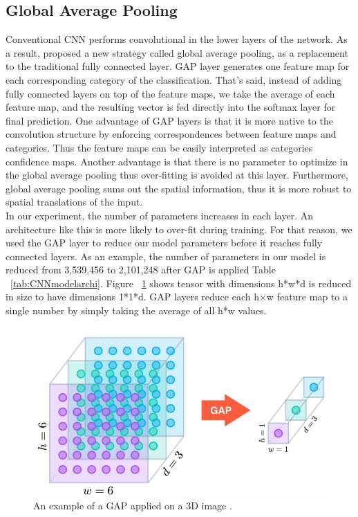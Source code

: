 \subsection{Global Average Pooling}
\hspace{5mm} Conventional CNN performs convolutional in the lower layers of the network. As a result, \cite{lin2013network} proposed a new strategy called global average pooling, as a replacement to the traditional fully connected layer. GAP layer generates one feature map for each corresponding category of the classification. That's said, instead of adding fully connected layers on top of the feature maps, we take the average of each feature map, and the resulting vector is fed directly into the softmax layer for final prediction. One advantage of GAP layers is that it is more native to the convolution structure by enforcing correspondences between
feature maps and categories. Thus the feature maps can be easily interpreted as categories confidence
maps. Another advantage is that there is no parameter to optimize in the global average pooling
thus over-fitting is avoided at this layer. Furthermore, global average pooling sums out the spatial
information, thus it is more robust to spatial translations of the input.\\

In our experiment, the number of parameters increases in each layer. An architecture like this is more likely to over-fit during training. For that reason, we used the GAP layer to reduce our model parameters before it reaches fully connected layers. As an example, the number of parameters in our model is reduced from 3,539,456 to 2,101,248 after GAP is applied Table ~\ref{tab:CNNmodelarchi}. Figure ~\ref{fig:gap} shows tensor with dimensions h*w*d is reduced in size to have dimensions 1*1*d. GAP layers reduce each h×w feature map to a single number by simply taking the average of all h*w values.

\begin{figure}[ht]
\centering
\includegraphics[width=0.6\columnwidth]{Figures/gap}
\decoRule
\caption[An example of a GAP applied on a 3D image \cite{lin2013network}.]{An example of a GAP applied on a 3D image \cite{lin2013network}.}
\label{fig:gap}
\end{figure}

